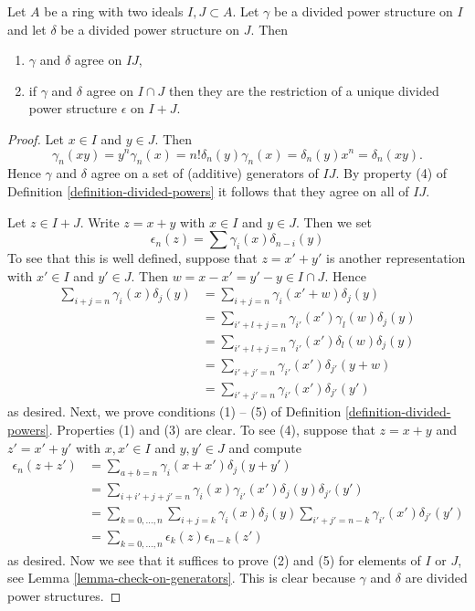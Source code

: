 \begin{lemma}
\label{lemma-two-ideals}
Let $A$ be a ring with two ideals $I, J \subset A$.
Let $\gamma$ be a divided power structure on $I$ and let
$\delta$ be a divided power structure on $J$.
Then
\begin{enumerate}
\item $\gamma$ and $\delta$ agree on $IJ$,
\item if $\gamma$ and $\delta$ agree on $I \cap J$ then they are
the restriction of a unique divided power structure $\epsilon$
on $I + J$.
\end{enumerate}
\end{lemma}

\begin{proof}
Let $x \in I$ and $y \in J$. Then
$$
\gamma_n(xy) = y^n\gamma_n(x) = n! \delta_n(y) \gamma_n(x) =
\delta_n(y) x^n = \delta_n(xy).
$$
Hence $\gamma$ and $\delta$ agree on a set of (additive) generators
of $IJ$. By property (4) of Definition \ref{definition-divided-powers}
it follows that they agree on all of $IJ$.

\medskip\noindent
Let $z \in I + J$. Write $z = x + y$ with $x \in I$ and $y \in J$.
Then we set
$$
\epsilon_n(z) = \sum \gamma_i(x)\delta_{n - i}(y)
$$
To see that this is well defined, suppose that $z = x' + y'$ is another
representation with $x' \in I$ and $y' \in J$. Then
$w = x - x' = y' - y \in I \cap J$. Hence
\begin{align*}
\sum\nolimits_{i + j = n} \gamma_i(x)\delta_j(y)
& =
\sum\nolimits_{i + j = n} \gamma_i(x' + w)\delta_j(y) \\
& =
\sum\nolimits_{i' + l + j = n} \gamma_{i'}(x')\gamma_l(w)\delta_j(y) \\
& =
\sum\nolimits_{i' + l + j = n} \gamma_{i'}(x')\delta_l(w)\delta_j(y) \\
& =
\sum\nolimits_{i' + j' = n} \gamma_{i'}(x')\delta_{j'}(y + w) \\
& =
\sum\nolimits_{i' + j' = n} \gamma_{i'}(x')\delta_{j'}(y')
\end{align*}
as desired. Next, we prove conditions (1) -- (5) of
Definition \ref{definition-divided-powers}.
Properties (1) and (3) are clear. To see (4), suppose
that $z = x + y$ and $z' = x' + y'$ with $x, x' \in I$ and $y, y' \in J$
and compute
\begin{align*}
\epsilon_n(z + z') & =
\sum\nolimits_{a + b = n} \gamma_i(x + x')\delta_j(y + y') \\
& =
\sum\nolimits_{i + i' + j + j' = n}
\gamma_i(x) \gamma_{i'}(x')\delta_j(y)\delta_{j'}(y') \\
& =
\sum\nolimits_{k = 0, \ldots, n}
\sum\nolimits_{i+j=k} \gamma_i(x)\delta_j(y)
\sum\nolimits_{i'+j'=n-k} \gamma_{i'}(x')\delta_{j'}(y') \\
& =
\sum\nolimits_{k = 0, \ldots, n}\epsilon_k(z)\epsilon_{n-k}(z')
\end{align*}
as desired. Now we see that it suffices to prove (2) and (5) for
elements of $I$ or $J$, see Lemma \ref{lemma-check-on-generators}.
This is clear because $\gamma$ and $\delta$ are divided power
structures.
\end{proof}

